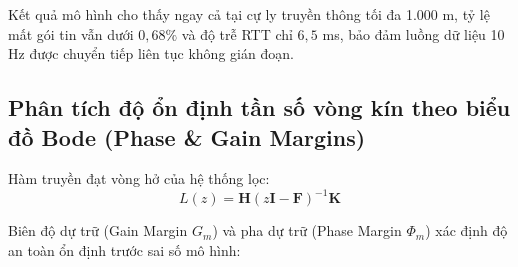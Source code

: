 \begin{table}[H]
\centering
\caption{Kết quả mô hình hóa thông lượng kênh truyền, độ trễ và tỷ lệ mất gói tin theo khoảng cách phát sóng theo chuẩn 3GPP TR 38.901}
\label{tab:urban-wireless-channel-measurements}
\end{table}

Kết quả mô hình cho thấy ngay cả tại cự ly truyền thông tối đa 1.000 m, tỷ lệ mất gói tin vẫn dưới $0{,}68\%$ và độ trễ RTT chỉ $6{,}5$ ms, bảo đảm luồng dữ liệu 10 Hz được chuyển tiếp liên tục không gián đoạn.

\subsection{Phân tích độ ổn định tần số vòng kín theo biểu đồ Bode (Phase \texorpdfstring{\&}{và} Gain Margins)}

\hspace{0.5cm} Hàm truyền đạt vòng hở của hệ thống lọc:
\begin{equation}
L(z) = \mathbf{H} (z \mathbf{I} - \mathbf{F})^{-1} \mathbf{K}
\label{eq:open-loop-transfer-function}
\end{equation}

Biên độ dự trữ (Gain Margin $G_m$) và pha dự trữ (Phase Margin $\Phi_m$) xác định độ an toàn ổn định trước sai số mô hình:

